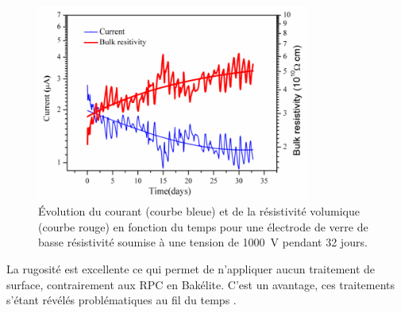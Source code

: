 \begin{figure}[ht!]
	\centering
	\includegraphics[width=0.80\textwidth]{GLA/resi.png}
	\captionsetup{type=figure}\caption{Évolution du courant (courbe bleue) et de la résistivité volumique (courbe rouge) en fonction du temps pour une électrode de verre de basse résistivité soumise à une tension de \SI{1000}{\volt} pendant \num{32} jours.}
	\label{resi}
\end{figure}

La rugosité est excellente ce qui permet de n'appliquer aucun traitement de surface, contrairement aux RPC en Bakélite. C'est un avantage, ces traitements s'étant révélés problématiques au fil du temps \cite{1352718}.

